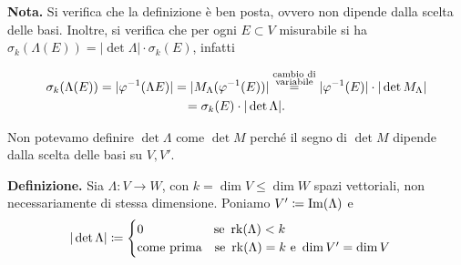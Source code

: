 \textbf{Nota.} Si verifica che la definizione è ben posta, ovvero non dipende dalla scelta delle basi. Inoltre, si verifica che per ogni $E \subset V$ misurabile si ha $\sigma_k(\Lambda(E)) = |\det \Lambda| \cdot \sigma_k(E)$, infatti
\begin{minipage}{0.2\textwidth}
%
%
\end{minipage}
%
\begin{minipage}{0.7\textwidth}
\begin{multline*}
	\sigma_k(\Lambda(E)) = | \varphi^{-1}(\Lambda E) |
	= | M_\Lambda (\varphi^{-1}(E)) |
	\overset{\substack{\text{cambio di} \\ \text{variabile}}}{=} | \varphi^{-1}(E) | \cdot | \det M_\Lambda | \\
	= \sigma_k(E) \cdot |\det \Lambda |.
\end{multline*}
\end{minipage}

Non potevamo definire $\det \Lambda$ come $\det M$ perché il segno di $\det M$ dipende dalla scelta delle basi su $V,V'$.

\vss

\textbf{Definizione.} Sia $\Lambda \colon V \to W$, con $k = \dim V \leq \dim W$ spazi vettoriali, non necessariamente di stessa dimensione. Poniamo $V' \coloneqq \operatorname{Im}(\Lambda)$ e 
%
$$
|\det \Lambda| \coloneqq 
\begin{cases}
	0 \qquad \qquad \quad \;\; \text{se } \operatorname{rk} (\Lambda) < k \\
	\text{come prima} \quad \text{se } \operatorname{rk}(\Lambda) = k \text{ e } \operatorname{dim} V' = \operatorname{dim} V
\end{cases} 
$$


